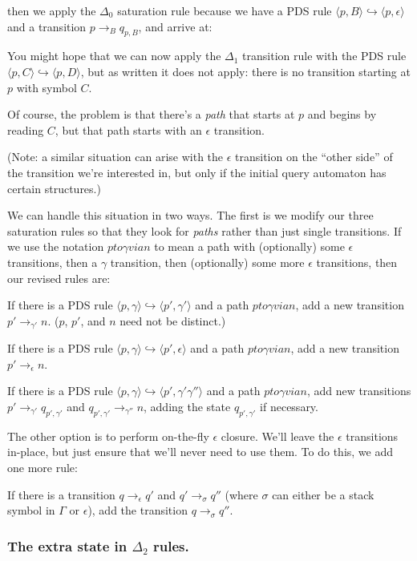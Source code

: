 \documentclass{article}
\newcommand{\Config}[2]{\ensuremath{\langle #1, #2 \rangle}}
\newcommand{\Rule}[2]{\ensuremath{#1 \hookrightarrow #2}}
\newcommand{\Trans}[3]{\ensuremath{#1 \rightarrow_{#2} #3}}
\newcommand{\epspath}[3]{\ensuremath{#1 to #2 via #3}}
\begin{document}
then we apply the $\Delta_0$ saturation rule because we have a PDS
rule \Rule{\Config{p}{B}}{\Config{p}{\epsilon}} and a transition
\Trans{p}{B}{q_{p,B}}, and arrive at:

You might hope that we can now apply the $\Delta_1$ transition rule
with the PDS rule \Rule{\Config{p}{C}}{\Config{p}{D}}, but as written
it does not apply: there is no transition starting at $p$ with symbol
$C$.

Of course, the problem is that there's a \emph{path} that starts at
$p$ and begins by reading $C$, but that path starts with an $\epsilon$
transition.

(Note: a similar situation can arise with the $\epsilon$ transition on
the ``other side'' of the transition we're interested in, but only if
the initial query automaton has certain structures.)

We can handle this situation in two ways. The first is we modify our
three saturation rules so that they look for \emph{paths} rather than
just single transitions. If we use the notation \epspath{p}{\gamma}{n}
to mean a path with (optionally) some $\epsilon$ transitions, then a
$\gamma$ transition, then (optionally) some more $\epsilon$ transitions,
then our revised rules are:


   If there is a PDS rule
   \Rule{\Config{p}{\gamma}}{\Config{p'}{\gamma'}} and a path
   \epspath{p}{\gamma}{n}, add a new transition
   \Trans{p'}{\gamma'}{n}. ($p$, $p'$, and $n$ need not be distinct.)

   If there is a PDS rule
   \Rule{\Config{p}{\gamma}}{\Config{p'}{\epsilon}} and a path
   \epspath{p}{\gamma}{n}, add a new transition
   \Trans{p'}{\epsilon}{n}.

   If there is a PDS rule
   \Rule{\Config{p}{\gamma}}{\Config{p'}{\gamma'\gamma''}} and a path
   \epspath{p}{\gamma}{n}, add new transitions
   \Trans{p'}{\gamma'}{q_{p',\gamma'}} and
   \Trans{q_{p',\gamma'}}{\gamma''}{n}, adding the state
   $q_{p',\gamma'}$ if necessary.


The other option is to perform on-the-fly $\epsilon$ closure. We'll
leave the $\epsilon$ transitions in-place, but just ensure that we'll
never need to use them. To do this, we add one more rule:

    If there is a transition \Trans{q}{\epsilon}{q'} and
    \Trans{q'}{\sigma}{q''} (where $\sigma$ can either be a stack
    symbol in $\Gamma$ or $\epsilon$), add the transition
    \Trans{q}{\sigma}{q''}.


\subsubsection{The extra state in $\Delta_2$ rules.}
\end{document}
